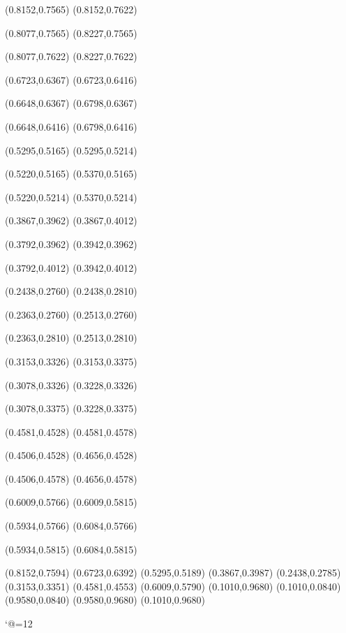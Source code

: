 \PST@Dashed(0.8152,0.7565)
(0.8152,0.7622)

\PST@Dashed(0.8077,0.7565)
(0.8227,0.7565)

\PST@Dashed(0.8077,0.7622)
(0.8227,0.7622)

\PST@Dashed(0.6723,0.6367)
(0.6723,0.6416)

\PST@Dashed(0.6648,0.6367)
(0.6798,0.6367)

\PST@Dashed(0.6648,0.6416)
(0.6798,0.6416)

\PST@Dashed(0.5295,0.5165)
(0.5295,0.5214)

\PST@Dashed(0.5220,0.5165)
(0.5370,0.5165)

\PST@Dashed(0.5220,0.5214)
(0.5370,0.5214)

\PST@Dashed(0.3867,0.3962)
(0.3867,0.4012)

\PST@Dashed(0.3792,0.3962)
(0.3942,0.3962)

\PST@Dashed(0.3792,0.4012)
(0.3942,0.4012)

\PST@Dashed(0.2438,0.2760)
(0.2438,0.2810)

\PST@Dashed(0.2363,0.2760)
(0.2513,0.2760)

\PST@Dashed(0.2363,0.2810)
(0.2513,0.2810)

\PST@Dashed(0.3153,0.3326)
(0.3153,0.3375)

\PST@Dashed(0.3078,0.3326)
(0.3228,0.3326)

\PST@Dashed(0.3078,0.3375)
(0.3228,0.3375)

\PST@Dashed(0.4581,0.4528)
(0.4581,0.4578)

\PST@Dashed(0.4506,0.4528)
(0.4656,0.4528)

\PST@Dashed(0.4506,0.4578)
(0.4656,0.4578)

\PST@Dashed(0.6009,0.5766)
(0.6009,0.5815)

\PST@Dashed(0.5934,0.5766)
(0.6084,0.5766)

\PST@Dashed(0.5934,0.5815)
(0.6084,0.5815)

\PST@Diamond(0.8152,0.7594)
\PST@Diamond(0.6723,0.6392)
\PST@Diamond(0.5295,0.5189)
\PST@Diamond(0.3867,0.3987)
\PST@Diamond(0.2438,0.2785)
\PST@Diamond(0.3153,0.3351)
\PST@Diamond(0.4581,0.4553)
\PST@Diamond(0.6009,0.5790)
\PST@Border(0.1010,0.9680)
(0.1010,0.0840)
(0.9580,0.0840)
(0.9580,0.9680)
(0.1010,0.9680)

\catcode`@=12
\fi
\endpspicture
